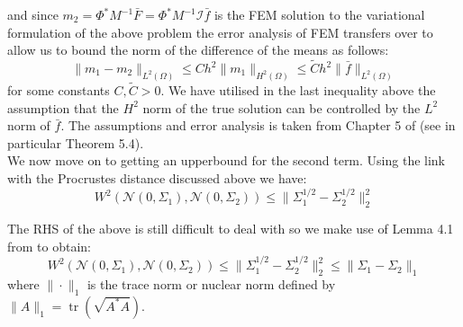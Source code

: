and since $m_2=\Phi^{*}M^{-1}\bar{F}=\Phi^{*}M^{-1}\mathcal{I}\bar{f}$ is the FEM solution to the variational formulation of the above problem the error analysis of FEM transfers over to allow us to bound the norm of the difference of the means as follows:
\begin{equation}
    \label{bound_on_diff_means}
    \|m_1-m_2\|_{L^{2}(\Omega)}\leq Ch^{2}\|m_{1}\|_{H^{2}(\Omega)}\leq\tilde{C}h^{2}\|\bar{f}\|_{L^{2}(\Omega)}
\end{equation}
for some constants $C,\tilde{C}>0$. We have utilised in the last inequality above the assumption that the $H^2$ norm of the true solution can be controlled by the $L^2$ norm of $\bar{f}$. The assumptions and error analysis is taken from Chapter 5 of \cite{larsson2008partial} (see in particular Theorem 5.4). \\

We now move on to getting an upperbound for the second term. Using the link with the Procrustes distance discussed above we have:
\begin{equation*}
    W^2(\mathcal{N}(0,\Sigma_1),\mathcal{N}(0,\Sigma_2))\leq\|\Sigma_{1}^{1/2}-\Sigma_{2}^{1/2}\|_{2}^{2}
\end{equation*}

The RHS of the above is still difficult to deal with so we make use of Lemma 4.1 from \cite{powers1970free} to obtain:
\begin{equation*}
    W^2(\mathcal{N}(0,\Sigma_1),\mathcal{N}(0,\Sigma_2))\leq\|\Sigma_{1}^{1/2}-\Sigma_{2}^{1/2}\|_{2}^{2}\leq\|\Sigma_1-\Sigma_2\|_{1}
\end{equation*}
where $\|\cdot\|_1$ is the trace norm or nuclear norm defined by $\|A\|_{1}=\operatorname{tr}(\sqrt{A^{*}A})$.

